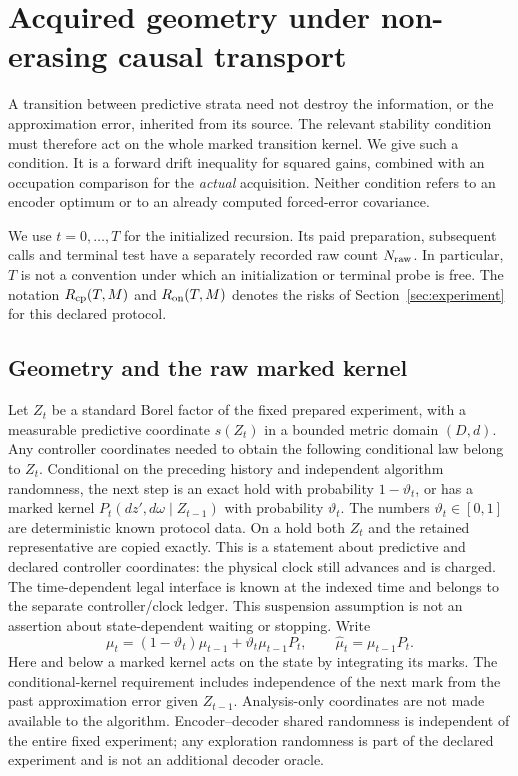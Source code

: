 \section{Acquired geometry under non-erasing causal transport}\label{sec:nonreset}
A transition between predictive strata need not destroy the information, or the approximation error, inherited from its source. The relevant stability condition must therefore act on the whole marked transition kernel. We give such a condition. It is a forward drift inequality for squared gains, combined with an occupation comparison for the \emph{actual} acquisition. Neither condition refers to an encoder optimum or to an already computed forced-error covariance.

We use $t=0,\ldots,T$ for the initialized recursion. Its paid preparation, subsequent calls and terminal test have a separately recorded raw count $N_{\rm raw}$. In particular, $T$ is not a convention under which an initialization or terminal probe is free. The notation $R_{\mathrm{cp}}(T,M)$ and $R_{\mathrm{on}}(T,M)$ denotes the risks of Section~\ref{sec:experiment} for this declared protocol.

\subsection{Geometry and the raw marked kernel}
Let $Z_t$ be a standard Borel factor of the fixed prepared experiment, with a measurable predictive coordinate $s(Z_t)$ in a bounded metric domain $(D,d)$. Any controller coordinates needed to obtain the following conditional law belong to $Z_t$. Conditional on the preceding history and independent algorithm randomness, the next step is an exact hold with probability $1-\vartheta_t$, or has a marked kernel $P_t(dz',d\omega\mid Z_{t-1})$ with probability $\vartheta_t$. The numbers $\vartheta_t\in[0,1]$ are deterministic known protocol data. On a hold both $Z_t$ and the retained representative are copied exactly. This is a statement about predictive and declared controller coordinates: the physical clock still advances and is charged. The time-dependent legal interface is known at the indexed time and belongs to the separate controller/clock ledger. This suspension assumption is not an assertion about state-dependent waiting or stopping. Write
\begin{equation}\label{eq:nr-law}
 \mu_t=(1-\vartheta_t)\mu_{t-1}+\vartheta_t\mu_{t-1}P_t,
 \qquad \widehat\mu_t=\mu_{t-1}P_t.
\end{equation}
Here and below a marked kernel acts on the state by integrating its marks. The conditional-kernel requirement includes independence of the next mark from the past approximation error given $Z_{t-1}$. Analysis-only coordinates are not made available to the algorithm. Encoder--decoder shared randomness is independent of the entire fixed experiment; any exploration randomness is part of the declared experiment and is not an additional decoder oracle.

